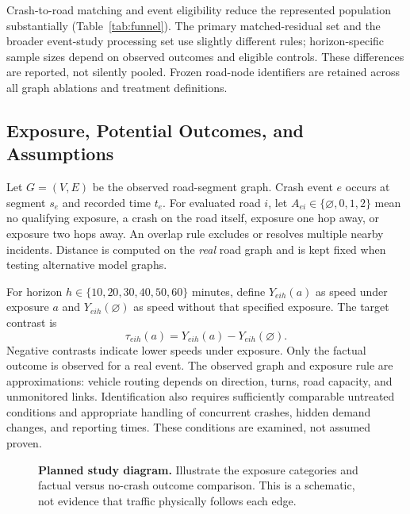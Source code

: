 \documentclass[sigconf,nonacm]{acmart}
\newcommand{\figslot}[2]{%
  \fbox{\begin{minipage}[c][#1][c]{0.92\columnwidth}
  \centering\small\textcolor{pendinggray}{\textbf{[FIGURE PENDING]}}\\[5pt]
  \textcolor{pendinggray}{#2}
  \end{minipage}}}
\begin{document}
Crash-to-road matching and event eligibility reduce the represented
population substantially (Table~\ref{tab:funnel}). The primary
matched-residual set and the broader event-study processing set use
slightly different rules; horizon-specific sample sizes depend on
observed outcomes and eligible controls. These differences are
reported, not silently pooled. Frozen road-node identifiers are
retained across all graph ablations and treatment definitions.

\subsection{Exposure, Potential Outcomes, and Assumptions}
Let $G=(V,E)$ be the observed road-segment graph. Crash event $e$ occurs
at segment $s_e$ and recorded time $t_e$. For evaluated road $i$,
let $A_{ei}\in\{\varnothing,0,1,2\}$ mean no qualifying exposure, a
crash on the road itself, exposure one hop away, or exposure two hops
away. An overlap rule excludes or resolves multiple nearby incidents.
Distance is computed on the \emph{real} road graph and is kept fixed
when testing alternative model graphs.

For horizon $h\in\{10,20,30,40,50,60\}$ minutes, define
$Y_{eih}(a)$ as speed under exposure $a$ and
$Y_{eih}(\varnothing)$ as speed without that specified exposure.
The target contrast is
\begin{equation}
 \tau_{eih}(a)=Y_{eih}(a)-Y_{eih}(\varnothing).
 \label{eq:effect}
\end{equation}
Negative contrasts indicate lower speeds under exposure. Only the
factual outcome is observed for a real event. The observed graph and
exposure rule are approximations: vehicle routing depends on direction,
turns, road capacity, and unmonitored links. Identification also
requires sufficiently comparable untreated conditions and appropriate
handling of concurrent crashes, hidden demand changes, and reporting
times. These conditions are examined, not assumed proven.

\begin{figure}[t]
\centering
\figslot{0.84in}{Automated network schematic: crash road (0-hop),\newline first and second neighboring rings; distinguish\newline graph exposure from physical propagation.}
\caption{\textbf{Planned study diagram.} Illustrate the exposure
categories and factual versus no-crash outcome comparison. This is a
schematic, not evidence that traffic physically follows each edge.}
\label{fig:design}
\end{figure}
\end{document}

